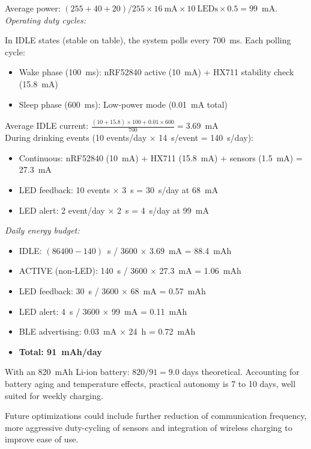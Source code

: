 \documentclass{article}
\begin{document}
Average power: $(255 + 40 + 20) / 255 \times 16~\text{mA} \times 10~\text{LEDs} \times 0.5 = 99$~mA.\\

\textit{Operating duty cycles:}

In IDLE states (stable on table), the system polls every 700~ms. Each polling cycle:
\begin{itemize}
    \item Wake phase (100~ms): nRF52840 active (10~mA) + HX711 stability check (15.8~mA)
    \item Sleep phase (600~ms): Low-power mode (0.01~mA total)
\end{itemize}

Average IDLE current: $\frac{(10 + 15.8) \times 100 + 0.01 \times 600}{700} = 3.69$~mA \\

During drinking events (10 events/day $\times$ 14~s/event = 140~s/day):
\begin{itemize}
    \item Continuous: nRF52840 (10~mA) + HX711 (15.8~mA) + sensors (1.5~mA) = 27.3~mA
    \item LED feedback: 10 events $\times$ 3~s = 30~s/day at 68~mA
    \item LED alert: 2 event/day $\times$ 2~s = 4~s/day at 99~mA
\end{itemize}

\textit{Daily energy budget:}
\begin{itemize}
    \item IDLE: $(86400 - 140)$~s / 3600 $\times$ 3.69~mA = 88.4~mAh
    \item ACTIVE (non-LED): 140~s / 3600 $\times$ 27.3~mA = 1.06~mAh
    \item LED feedback: 30~s / 3600 $\times$ 68~mA = 0.57~mAh
    \item LED alert: 4~s / 3600 $\times$ 99~mA = 0.11~mAh
    \item BLE advertising: 0.03~mA $\times$ 24~h = 0.72~mAh
    \item \textbf{Total: 91~mAh/day}
\end{itemize}

With an 820~mAh Li-ion battery: $820 / 91 = 9.0$ days theoretical. Accounting for battery aging and temperature effects, practical autonomy is 7 to 10 days, well suited for weekly charging.\vspace{0.2cm}

Future optimizations could include further reduction of communication frequency, more aggressive duty-cycling of sensors and integration of wireless charging to improve ease of use.\vspace{0.2cm}
\end{document}
